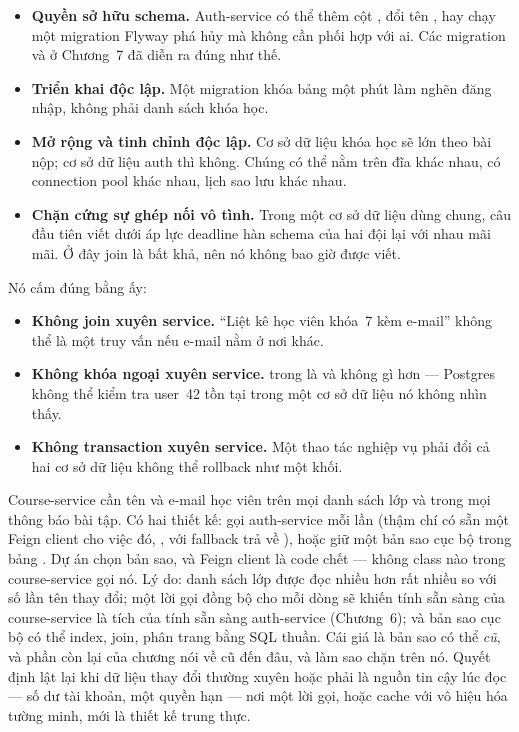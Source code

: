 \begin{itemize}
  \item \textbf{Quyền sở hữu schema.} Auth-service có thể thêm cột
  , đổi tên , hay chạy một
  migration Flyway phá hủy mà không cần phối hợp với ai. Các migration
   và  ở Chương~7 đã diễn ra đúng như thế.
  \item \textbf{Triển khai độc lập.} Một migration khóa bảng
   một phút làm nghẽn đăng nhập, không phải danh sách khóa
  học.
  \item \textbf{Mở rộng và tinh chỉnh độc lập.} Cơ sở dữ liệu khóa học
  sẽ lớn theo bài nộp; cơ sở dữ liệu auth thì không. Chúng có thể nằm
  trên đĩa khác nhau, có connection pool khác nhau, lịch sao lưu khác
  nhau.
  \item \textbf{Chặn cứng sự ghép nối vô tình.} Trong một cơ sở dữ
  liệu dùng chung, câu 
  đầu tiên viết dưới áp lực deadline hàn schema của hai đội lại với nhau
  mãi mãi. Ở đây join là bất khả, nên nó không bao giờ được viết.
\end{itemize}

Nó cấm đúng bằng ấy:

\begin{itemize}
  \item \textbf{Không join xuyên service.} ``Liệt kê học viên khóa~7
  kèm e-mail'' không thể là một truy vấn nếu e-mail nằm ở nơi khác.
  \item \textbf{Không khóa ngoại xuyên service.} 
  trong  là  và không gì hơn --- Postgres không thể kiểm tra user~42 tồn
  tại trong một cơ sở dữ liệu nó không nhìn thấy.
  \item \textbf{Không transaction xuyên service.} Một thao tác nghiệp
  vụ phải đổi cả hai cơ sở dữ liệu không thể rollback như một khối.
\end{itemize}

\begin{decision}
Course-service cần tên và e-mail học viên trên mọi danh sách lớp và
trong mọi thông báo bài tập. Có hai thiết kế: gọi auth-service mỗi lần
(thậm chí có sẵn một Feign client cho việc đó,
, với fallback trả về ),
hoặc giữ một bản sao cục bộ trong bảng . Dự án chọn bản
sao, và Feign client là code chết --- không class nào trong
course-service gọi nó. Lý do: danh sách lớp được đọc nhiều hơn rất
nhiều so với số lần tên thay đổi; một lời gọi đồng bộ cho mỗi dòng sẽ
khiến tính sẵn sàng của course-service là tích của tính sẵn sàng
auth-service (Chương~6); và bản sao cục bộ có thể index, join, phân
trang bằng SQL thuần. Cái giá là bản sao có thể \emph{cũ}, và phần còn
lại của chương nói về cũ đến đâu, và làm sao chặn trên nó. Quyết định
lật lại khi dữ liệu thay đổi thường xuyên hoặc phải là nguồn tin cậy
lúc đọc --- số dư tài khoản, một quyền hạn --- nơi một lời gọi, hoặc
cache với vô hiệu hóa tường minh, mới là thiết kế trung thực.
\end{decision}

